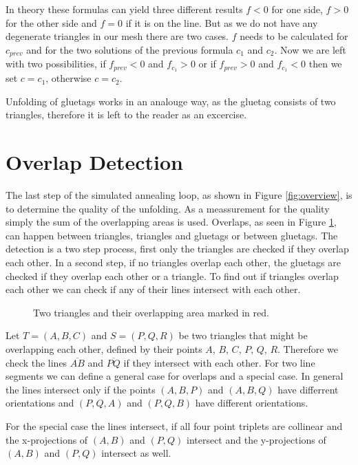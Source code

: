 \documentclass[draft,final]{vutinfth} %
\begin{document}
In theory these formulas can yield three different results $f < 0$ for one side, $f > 0$ for the other side and $f = 0$ if it is on the line. But as we do not have any degenerate triangles in our mesh there are two cases. $f$ needs to be calculated for $c_{prev}$ and for the two solutions of the previous formula $c_1$ and $c_2$. Now we are left with two possibilities, if $f_{prev} < 0$ and $f_{c_1} > 0$ or if $f_{prev} > 0$ and $f_{c_1} < 0$ then we set $c = c_1$, otherwise $c = c_2$.

Unfolding of gluetags works in an analouge way, as the gluetag consists of two triangles, therefore it is left to the reader as an excercise.

\section{Overlap Detection}

The last step of the simulated annealing loop, as shown in Figure \ref{fig:overview}, is to determine the quality of the unfolding. As a meassurement for the quality simply the sum of the overlapping areas is used. Overlaps, as seen in Figure \ref{fig:overlap}, can happen between triangles, triangles and gluetags or between gluetags. The detection is a two step process, first only the triangles are checked if they overlap each other. In a second step, if no triangles overlap each other, the gluetags are checked if they overlap each other or a triangle. To find out if triangles overlap each other we can check if any of their lines intersect with each other.

\begin{figure}

\caption{Two triangles and their overlapping area marked in red.}
\label{fig:overlap}
\end{figure}

Let $T = (A,B,C)$ and $S = (P,Q,R)$ be two triangles that might be overlapping each other, defined by their points $A$, $B$, $C$, $P$, $Q$, $R$. Therefore we check the lines $\overline{AB}$ and $\overline{PQ}$ if they intersect with each other. For two line segments we can define a general case for overlaps and a special case. In general the lines intersect only if the points $(A,B,P)$ and $(A,B,Q)$ have differrent orientations and $(P,Q,A)$ and $(P,Q,B)$ have different orientations.

For the special case the lines intersect, if all four point triplets are collinear and the x-projections of $(A,B)$ and $(P,Q)$ intersect and the y-projections of $(A,B)$ and $(P,Q)$ intersect as well.
\end{document}
